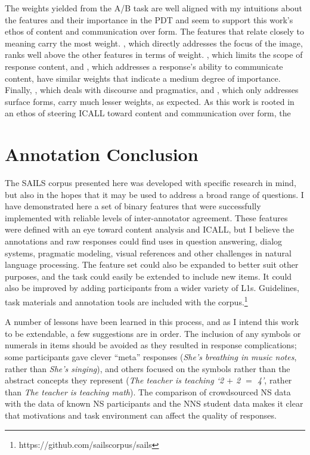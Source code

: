 The weights yielded from the A/B task are well aligned with my intuitions about the features and their importance in the PDT and seem to support this work's ethos of content and communication over form. The features that relate closely to meaning carry the most weight. , which directly addresses the focus of the image, ranks well above the other features in terms of weight. , which limits the scope of response content, and , which addresses a response's ability to communicate content, have similar weights that indicate a medium degree of importance. Finally, , which deals with discourse and pragmatics, and , which only addresses surface forms, carry much lesser weights, as expected. As this work is rooted in an ethos of steering ICALL toward content and communication over form, the  

\section{Annotation Conclusion}

The SAILS corpus presented here was developed with specific research in mind, but also in the hopes that it may be used to address a broad range of questions. I have demonstrated here a set of binary features that were successfully implemented with reliable levels of inter-annotator agreement. These features were defined with an eye toward content analysis and ICALL, but I believe the annotations and raw responses could find uses in question answering, dialog systems, pragmatic modeling, visual references and other challenges in natural language processing. The feature set could also be expanded to better suit other purposes, and the task could easily be extended to include new items. It could also be improved by adding participants from a wider variety of L1s. Guidelines, task materials and annotation tools are included with the corpus.\footnote{https://github.com/sailscorpus/sails}

A number of lessons have been learned in this process, and as I intend this work to be extendable, a few suggestions are in order. The inclusion of any symbols or numerals in items should be avoided as they resulted in response complications; some participants gave clever ``meta'' responses (\textit{She's breathing in music notes}, rather than \textit{She's singing}), and others focused on the symbols rather than the abstract concepts they represent (\textit{The teacher is teaching `2 $+$ 2 $=$ 4'}, rather than \textit{The teacher is teaching math}). The comparison of crowdsourced NS data with the data of known NS participants and the NNS student data makes it clear that motivations and task environment can affect the quality of responses.

